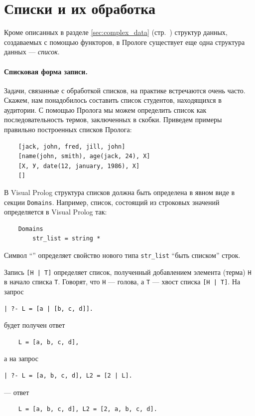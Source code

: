 \documentclass[12pt, openany, twoside]{book} %
\begin{document}

\section{Списки и их обработка}

Кроме описанных в разделе \ref{sec:complex_data} (стр.~\pageref{sec:complex_data}) структур данных, создаваемых с помощью функторов, в Прологе существует еще одна структура данных --- {\em список}.

\paragraph{Списковая форма записи.} Задачи, связанные с обработкой списков, на практике встречаются очень часто. Скажем, нам понадобилось составить список студентов, находящихся в аудитории. С помощью Пролога мы можем определить список как последовательность термов, заключенных в скобки. Приведем примеры правильно построенных списков Пролога:

{\tt\begin{verbatim}
    [jack, john, fred, jill, john]
    [name(john, smith), age(jack, 24), X]
    [Х, У, date(12, january, 1986), Х]
    []
\end{verbatim}}
\noindent В Visual Prolog структура списков должна быть определена в явном виде в секции {\tt Domains}. Например, список, состоящий из строковых значений определяется в Visual Prolog так:
{\tt\begin{verbatim}
    Domains
        str_list = string *
\end{verbatim}}
\noindent Символ ``{\tt *}'' определяет свойство нового типа {\tt str\_list} ``быть списком'' строк.

Запись {\tt [H | T]} определяет список, полученный добавлением элемента (терма) {\tt Н} в начало списка {\tt Т}. Говорят, что {\tt Н} --- голова, а {\tt Т} --- хвост списка {\tt [H | T]}. На запрос
{\tt\begin{verbatim}
| ?- L = [a | [b, c, d]].
\end{verbatim}}
\noindent будет получен ответ
{\tt\begin{verbatim}
    L = [a, b, c, d],
\end{verbatim}}
\noindent а на запрос
{\tt\begin{verbatim}
| ?- L = [a, b, c, d], L2 = [2 | L].
\end{verbatim}}
\noindent --- ответ
{\tt\begin{verbatim}
    L = [a, b, c, d], L2 = [2, a, b, c, d].
\end{verbatim}}
\end{document}

